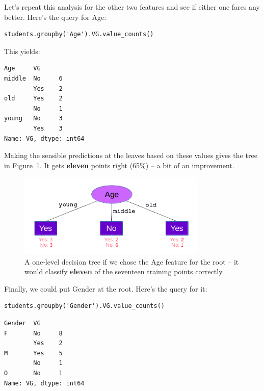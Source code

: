 Let's repeat this analysis for the other two features and see if either one
fares any better. Here's the query for \textsf{Age}:

\begin{Verbatim}[fontsize=\small,samepage=true,frame=single,framesep=3mm]
students.groupby('Age').VG.value_counts()
\end{Verbatim}

This yields:

\begin{Verbatim}[fontsize=\small,samepage=true,frame=leftline,framesep=5mm,framerule=1mm]
Age     VG 
middle  No     6
        Yes    2
old     Yes    2
        No     1
young   No     3
        Yes    3
Name: VG, dtype: int64
\end{Verbatim}

Making the sensible predictions at the leaves based on these values gives the
tree in Figure~\ref{fig:ageOnTop}. It gets \textbf{eleven} points right (65\%)
-- a bit of an improvement.

\begin{figure}[ht]
\centering
\includegraphics[width=0.8\textwidth]{ageOnTop.png}
\caption{A one-level decision tree if we chose the \textsf{Age} feature for the
root -- it would classify \textbf{eleven} of the seventeen training points
correctly.}
\label{fig:ageOnTop}
\end{figure}

Finally, we could put \textsf{Gender} at the root. Here's the query for it:

\begin{samepage}
\begin{Verbatim}[fontsize=\small,samepage=true,frame=single,framesep=3mm]
students.groupby('Gender').VG.value_counts()
\end{Verbatim}
\vspace{-.2in}

\begin{Verbatim}[fontsize=\small,samepage=true,frame=leftline,framesep=5mm,framerule=1mm]
Gender  VG 
F       No     8
        Yes    2
M       Yes    5
        No     1
O       No     1
Name: VG, dtype: int64
\end{Verbatim}
\end{samepage}

